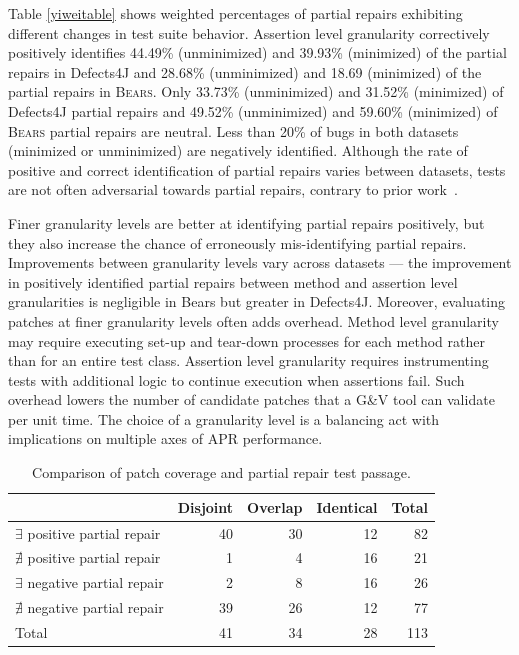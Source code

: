 \documentclass[10pt, conference]{IEEEtran}
\newcommand\bears{\textsc{Bears}\xspace}
\begin{document}
Table \ref{yiweitable} shows weighted percentages of partial repairs exhibiting
different changes in test suite behavior.
Assertion level granularity correctively positively identifies
44.49\% (unminimized) and 39.93\% (minimized) of the partial repairs in Defects4J
and 28.68\% (unminimized) and 18.69 (minimized) of the partial repairs in \bears.
Only 33.73\% (unminimized) and 31.52\% (minimized) of Defects4J partial repairs and 
49.52\% (unminimized) and 59.60\% (minimized)
of \bears partial repairs are neutral. Less than 20\% of bugs in both datasets
(minimized or unminimized) are negatively identified.
Although the rate of positive and correct identification of partial repairs varies between datasets,
tests are not often adversarial towards partial repairs, contrary to prior work~\cite{gecco09}.

Finer granularity levels are better at identifying partial repairs positively,
but they also increase the chance of erroneously mis-identifying partial repairs.
Improvements between granularity levels vary across datasets --- the improvement 
in positively identified partial repairs between method and assertion level granularities
is negligible in Bears but greater in Defects4J.
Moreover, evaluating patches at finer granularity levels often adds overhead.
Method level granularity may require executing set-up
and tear-down processes for each method rather than for
an entire test class.
Assertion level granularity requires instrumenting tests with additional
logic to continue execution when assertions fail.
Such overhead lowers the number of
candidate patches that a G\&V tool can validate per unit time.
The choice of a granularity level is a balancing act with implications on
multiple axes of APR performance.

\begin{table}
        {\begin{center}
                        \begin{tabular} {lrrrr}
                                \toprule
                                & Disjoint & Overlap & Identical & Total \\
                                \midrule
                                $\exists$ positive partial repair & 40 & 30 & 12 & 82 \\
                                $\nexists$ positive partial repair & 1 & 4 & 16 &  21 \\
                \midrule
                                $\exists$ negative partial repair & 2 & 8 & 16 & 26 \\
                                $\nexists$ negative partial repair & 39 & 26 & 12 & 77 \\
                \midrule
                                Total & 41 & 34 & 28 & 113 \\
                \bottomrule
                        \end{tabular}
                \end{center}
        }
        \caption{Comparison of patch coverage and partial repair
        test passage.}
        \label{tab:cov_fitness}
\end{table}
\end{document}
